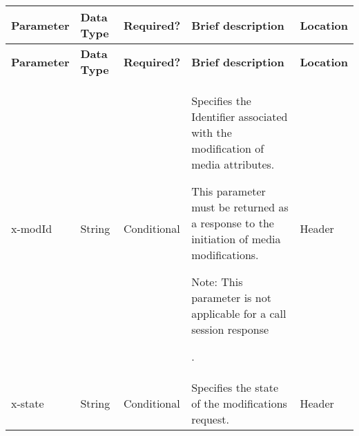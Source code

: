 {\footnotesize{}}%
\begin{longtable}{|>{\raggedright}p{}|>{\raggedright}p{}|>{\raggedright}p{}|>{\raggedright}p{}|>{\raggedright}p{}|}
\hline
\hline 
\textbf{\footnotesize{Parameter }} & \textbf{\footnotesize{Data Type}} & \textbf{\footnotesize{Required?}} & \textbf{\footnotesize{Brief description}} & \textbf{\footnotesize{Location}}\tabularnewline
\hline 
\hline
\endfirsthead
\hline
\hline 
\textbf{\footnotesize{Parameter }} & \textbf{\footnotesize{Data Type}} & \textbf{\footnotesize{Required?}} & \textbf{\footnotesize{Brief description}} & \textbf{\footnotesize{Location}}\tabularnewline
\hline 
\hline
\endhead
\hline 
x-modId & String & Conditional & Specifies the Identifier associated with the modification of media
attributes.

This parameter must be returned as a response to the initiation of
media modifications.

Note: This parameter is not applicable for a call session response

. & Header\tabularnewline
\hline 
x-state & String & Conditional & Specifies the state of the modifications request. & Header\tabularnewline
\hline 
\end{longtable}{\footnotesize \par}

{\footnotesize{}}

